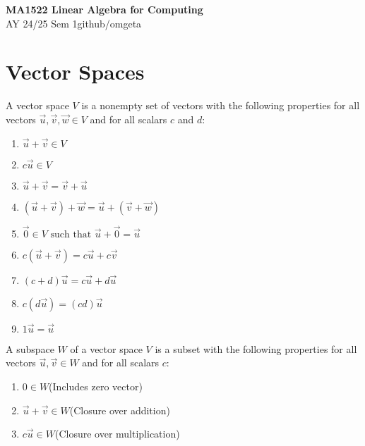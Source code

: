 \documentclass[12pt, a4paper]{article}
\newcommand{\mytitle}{MA1522 Linear Algebra for Computing}
\newcommand{\myauthor}{github/omgeta}
\newcommand{\mydate}{AY 24/25 Sem 1}
\begin{document}
\raggedright
\footnotesize
\begin{multicols*}{3}
\setlength{\premulticols}{1pt}
\setlength{\postmulticols}{1pt}
\setlength{\multicolsep}{1pt}
\setlength{\columnsep}{1pt}

{\normalsize{\textbf{\mytitle}}} \\
{\footnotesize{\mydate\hspace{2pt}\textemdash\hspace{2pt}\myauthor}}
\vspace{-1em}
\section{Vector Spaces}
A vector space $V$ is a nonempty set of vectors with the following properties for all vectors $\vec{u}, \vec{v}, \vec{w} \in V$ and for all scalars $c$ and $d$:
\begin{enumerate}[\roman*.]
  \item $\vec{u} + \vec{v} \in V$
  \item $c\vec{u} \in V$
  \item $\vec{u} + \vec{v} = \vec{v} + \vec{u}$
  \item $(\vec{u} + \vec{v}) + \vec{w} = \vec{u} + (\vec{v} + \vec{w})$
  \item $\vec{0} \in V \text{ such that } \vec{u} + \vec{0} = \vec{u}$
  \item $c(\vec{u} + \vec{v}) = c\vec{u} + c\vec{v}$
  \item $(c + d)\vec{u} = c\vec{u} + d\vec{u}$
  \item $c(d\vec{u}) = (cd)\vec{u}$ 
  \item $1\vec{u} = \vec{u}$
\end{enumerate}

A subspace $W$ of a vector space $V$ is a subset with the following properties for all vectors $\vec{u}, \vec{v} \in W$ and for all scalars $c$:
\begin{enumerate}[\roman*.]
  \item $0 \in W$\hfill(Includes zero vector)
  \item $\vec{u} + \vec{v} \in W$\hfill(Closure over addition)
  \item $c\vec{u} \in W$\hfill(Closure over multiplication)
\end{enumerate}


\end{multicols*}
\end{document}
